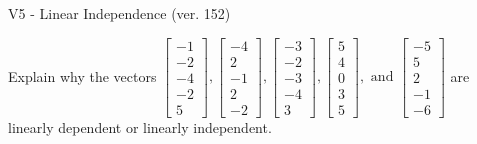 \begin{exercise}
  \begin{exerciseTitle}V5 - Linear Independence (ver. 152)\end{exerciseTitle}
  \begin{exerciseStatement}
    Explain why the vectors \(\left[\begin{array}{r}
-1 \\
-2 \\
-4 \\
-2 \\
5
\end{array}\right] , \left[\begin{array}{r}
-4 \\
2 \\
-1 \\
2 \\
-2
\end{array}\right] , \left[\begin{array}{r}
-3 \\
-2 \\
-3 \\
-4 \\
3
\end{array}\right] , \left[\begin{array}{r}
5 \\
4 \\
0 \\
3 \\
5
\end{array}\right] , \text{ and } \left[\begin{array}{r}
-5 \\
5 \\
2 \\
-1 \\
-6
\end{array}\right]\) are linearly dependent or linearly independent.	



\end{exerciseStatement}
\end{exercise}
